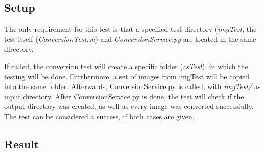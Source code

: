 \subsection{Setup}

The only requirement for this test is that a specified test directory (\emph{imgTest}, the test itself (\emph{ConversionTest.sh}) and \emph{ConversionService.py} are located in the same directory. 

If called, the conversion test will create a specific folder (\emph{csTest}), in which the testing will be done. Furthermore, a set of images from imgTest will be copied into the same folder. Afterwards, ConversionService.py is called, with \emph{imgTest/} as input directory. After ConversionService.py is done, the test will check if the output directory was created, as well as every image was converted successfully. The test can be considered a success, if both cases are given.


\subsection{Result}
